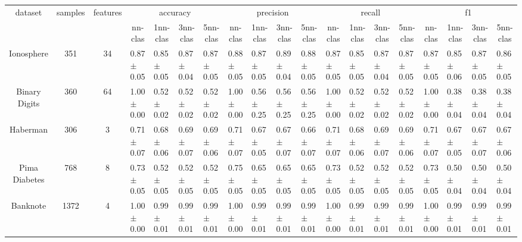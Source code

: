 \begin{table}[H]
\begin{tabular}{cccllllllllllllllll}
\multirow{2}{*}{dataset} & \multirow{2}{*}{samples} & \multirow{2}{*}{features} & 
\multicolumn{4}{c}{accuracy} & \multicolumn{4}{c}{precision} & 
\multicolumn{4}{c}{recall} & \multicolumn{4}{c}{f1} \\
 & & & 
\multicolumn{1}{c}{nn-clas} & \multicolumn{1}{c}{1nn-clas} & 
\multicolumn{1}{c}{3nn-clas} & \multicolumn{1}{c}{5nn-clas} & 
\multicolumn{1}{c}{nn-clas} & \multicolumn{1}{c}{1nn-clas} & 
\multicolumn{1}{c}{3nn-clas} & \multicolumn{1}{c}{5nn-clas} & 
\multicolumn{1}{c}{nn-clas} & \multicolumn{1}{c}{1nn-clas} & 
\multicolumn{1}{c}{3nn-clas} & \multicolumn{1}{c}{5nn-clas} & 
\multicolumn{1}{c}{nn-clas} & \multicolumn{1}{c}{1nn-clas} & 
\multicolumn{1}{c}{3nn-clas} & \multicolumn{1}{c}{5nn-clas} \\
Ionosphere & 351 & 34 & 0.87 $\pm$ 0.05 & 0.85 $\pm$ 0.05 & 0.87 $\pm$ 0.04 & 0.87 $\pm$ 0.05 & 0.88 $\pm$ 0.05 & 0.87 $\pm$ 0.05 & 0.89 $\pm$ 0.04 & 0.88 $\pm$ 0.05 & 0.87 $\pm$ 0.05 & 0.85 $\pm$ 0.05 & 0.87 $\pm$ 0.04 & 0.87 $\pm$ 0.05 & 0.87 $\pm$ 0.05 & 0.85 $\pm$ 0.06 & 0.87 $\pm$ 0.05 & 0.86 $\pm$ 0.05 \\
Binary Digits & 360 & 64 & 1.00 $\pm$ 0.00 & 0.52 $\pm$ 0.02 & 0.52 $\pm$ 0.02 & 0.52 $\pm$ 0.02 & 1.00 $\pm$ 0.00 & 0.56 $\pm$ 0.25 & 0.56 $\pm$ 0.25 & 0.56 $\pm$ 0.25 & 1.00 $\pm$ 0.00 & 0.52 $\pm$ 0.02 & 0.52 $\pm$ 0.02 & 0.52 $\pm$ 0.02 & 1.00 $\pm$ 0.00 & 0.38 $\pm$ 0.04 & 0.38 $\pm$ 0.04 & 0.38 $\pm$ 0.04 \\
Haberman & 306 & 3 & 0.71 $\pm$ 0.07 & 0.68 $\pm$ 0.06 & 0.69 $\pm$ 0.07 & 0.69 $\pm$ 0.06 & 0.71 $\pm$ 0.07 & 0.67 $\pm$ 0.05 & 0.67 $\pm$ 0.07 & 0.66 $\pm$ 0.07 & 0.71 $\pm$ 0.07 & 0.68 $\pm$ 0.06 & 0.69 $\pm$ 0.07 & 0.69 $\pm$ 0.06 & 0.71 $\pm$ 0.07 & 0.67 $\pm$ 0.05 & 0.67 $\pm$ 0.07 & 0.67 $\pm$ 0.06 \\
Pima Diabetes & 768 & 8 & 0.73 $\pm$ 0.05 & 0.52 $\pm$ 0.05 & 0.52 $\pm$ 0.05 & 0.52 $\pm$ 0.05 & 0.75 $\pm$ 0.05 & 0.65 $\pm$ 0.05 & 0.65 $\pm$ 0.05 & 0.65 $\pm$ 0.05 & 0.73 $\pm$ 0.05 & 0.52 $\pm$ 0.05 & 0.52 $\pm$ 0.05 & 0.52 $\pm$ 0.05 & 0.73 $\pm$ 0.05 & 0.50 $\pm$ 0.04 & 0.50 $\pm$ 0.04 & 0.50 $\pm$ 0.04 \\
Banknote & 1372 & 4 & 1.00 $\pm$ 0.00 & 0.99 $\pm$ 0.01 & 0.99 $\pm$ 0.01 & 0.99 $\pm$ 0.01 & 1.00 $\pm$ 0.00 & 0.99 $\pm$ 0.01 & 0.99 $\pm$ 0.01 & 0.99 $\pm$ 0.01 & 1.00 $\pm$ 0.00 & 0.99 $\pm$ 0.01 & 0.99 $\pm$ 0.01 & 0.99 $\pm$ 0.01 & 1.00 $\pm$ 0.00 & 0.99 $\pm$ 0.01 & 0.99 $\pm$ 0.01 & 0.99 $\pm$ 0.01 \\

\end{tabular}
\end{table}
